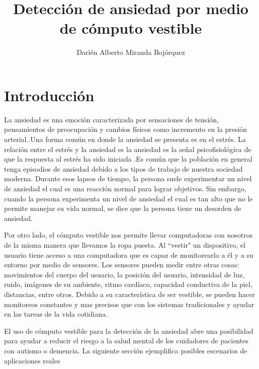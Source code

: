 \documentclass[letterpaper,12pt]{cicese}
\begin{document}
	\doublespace
	\title{Detecci\'on de ansiedad por medio de c\'omputo vestible}
	\author{Dari\'en Alberto Miranda Boj\'orquez}
	\maketitle
        \maketitle
        \newpage
        \tableofcontents
        \newpage


                \chapter{Introducci\'on}
                        La ansiedad es una emoci\'on caracterizada por sensaciones de tensi\'on, pensamientos de preocupaci\'on y cambios f\'isicos como incremento en la presi\'on arterial.\citep{psychologyapa}.Una forma com\'un en donde la ansiedad se presenta es en el estr\'es. La relaci\'on entre el estr\'es y la ansiedad es la ansiedad es la se\~nal psicofisiol\'ogica de que la respuesta al estr\'es ha sido iniciada \citep{PMID2235645}.Es com\'un que la poblaci\'on en general tenga episodios de ansiedad debido a los tipos de trabajo de nuestra sociedad moderna. Durante esos lapsos de tiempo, la persona suele experimentar un nivel de ansiedad el cual es una reacci\'on normal para lograr objetivos. Sin embargo, cuando la persona experimenta un nivel de ansiedad el cual es tan alto que no le permite manejar su vida normal, se dice que la persona tiene un desorden de ansiedad\citep{repetto2013}.


                        Por otro lado, el c\'omputo vestible nos permite llevar computadoras con nosotros de la misma manera que llevamos la ropa puesta. Al ``vestir" un dispositivo,
                        el usuario tiene acceso a una computadora que es capaz de monitorearlo a \'el y a su entorno por medio de sensores. Los sensores pueden medir entre
                        otras cosas: movimientos del cuerpo del usuario, la posici\'on del usuario, intensidad de luz, ruido, im\'agenes de su ambiente, ritmo card\'iaco, capacidad
                        conductiva de la piel, distancias, entre otros. Debido a su caracter\'istica de ser vestible, se pueden hacer monitoreos constantes y mas precisos que con
                        los sistemas tradicionales y ayudar en las tareas de la vida cotidiana.

                        El uso de c\'omputo vestible para la detecci\'on de la ansiedad abre una posibilidad para ayudar a reducir el riesgo a la salud mental
                        de los cuidadores de pacientes con autismo o demencia. La siguiente secci\'on ejemplifica posibles escenarios de aplicaciones reales
\end{document}

